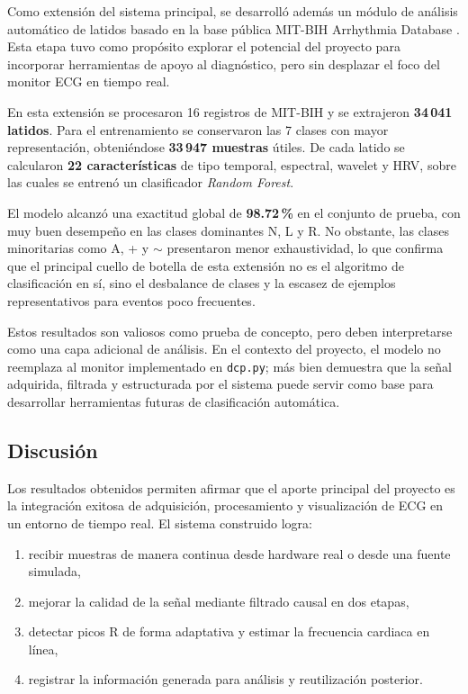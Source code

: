 Como extensión del sistema principal, se desarrolló además un módulo de análisis
automático de latidos basado en la base pública MIT-BIH Arrhythmia Database
\cite{mitbih}. Esta etapa tuvo como propósito explorar el potencial del proyecto
para incorporar herramientas de apoyo al diagnóstico, pero sin desplazar el foco
del monitor ECG en tiempo real.

En esta extensión se procesaron 16 registros de MIT-BIH y se extrajeron
\textbf{34\,041 latidos}. Para el entrenamiento se conservaron las 7 clases con
mayor representación, obteniéndose \textbf{33\,947 muestras} útiles. De cada
latido se calcularon \textbf{22 características} de tipo temporal, espectral,
wavelet y HRV, sobre las cuales se entrenó un clasificador \textit{Random Forest}.

El modelo alcanzó una exactitud global de \textbf{98.72\,\%} en el conjunto de
prueba, con muy buen desempeño en las clases dominantes N, L y R. No obstante,
las clases minoritarias como A, + y $\sim$ presentaron menor exhaustividad, lo
que confirma que el principal cuello de botella de esta extensión no es el
algoritmo de clasificación en sí, sino el desbalance de clases y la escasez de
ejemplos representativos para eventos poco frecuentes.

Estos resultados son valiosos como prueba de concepto, pero deben interpretarse
como una capa adicional de análisis. En el contexto del proyecto, el modelo no
reemplaza al monitor implementado en \texttt{dcp.py}; más bien demuestra que la
señal adquirida, filtrada y estructurada por el sistema puede servir como base
para desarrollar herramientas futuras de clasificación automática.

\subsection{Discusión}

Los resultados obtenidos permiten afirmar que el aporte principal del proyecto es
la integración exitosa de adquisición, procesamiento y visualización de ECG en un
entorno de tiempo real. El sistema construido logra:

\begin{enumerate}
    \item recibir muestras de manera continua desde hardware real o desde una
        fuente simulada,
    \item mejorar la calidad de la señal mediante filtrado causal en dos etapas,
    \item detectar picos R de forma adaptativa y estimar la frecuencia cardiaca en línea,
    \item registrar la información generada para análisis y reutilización posterior.
\end{enumerate}

